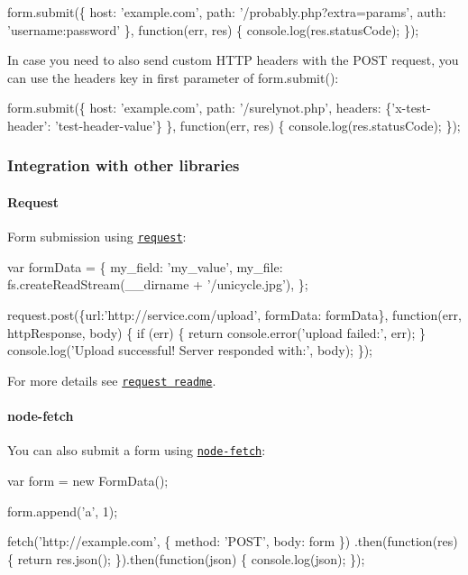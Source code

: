 \begin{DoxyCode}
form.submit(\{
  host: 'example.com',
  path: '/probably.php?extra=params',
  auth: 'username:password'
\}, function(err, res) \{
  console.log(res.statusCode);
\});
\end{DoxyCode}


In case you need to also send custom H\+T\+TP headers with the P\+O\+ST request, you can use the {\ttfamily headers} key in first parameter of {\ttfamily form.\+submit()}\+:


\begin{DoxyCode}
form.submit(\{
  host: 'example.com',
  path: '/surelynot.php',
  headers: \{'x-test-header': 'test-header-value'\}
\}, function(err, res) \{
  console.log(res.statusCode);
\});
\end{DoxyCode}


\subsubsection*{Integration with other libraries}

\paragraph*{Request}

Form submission using \href{https://github.com/request/request}{\tt request}\+:


\begin{DoxyCode}
var formData = \{
  my\_field: 'my\_value',
  my\_file: fs.createReadStream(\_\_dirname + '/unicycle.jpg'),
\};

request.post(\{url:'http://service.com/upload', formData: formData\}, function(err, httpResponse, body) \{
  if (err) \{
    return console.error('upload failed:', err);
  \}
  console.log('Upload successful!  Server responded with:', body);
\});
\end{DoxyCode}


For more details see \href{https://github.com/request/request#multipartform-data-multipart-form-uploads}{\tt request readme}.

\paragraph*{node-\/fetch}

You can also submit a form using \href{https://github.com/bitinn/node-fetch}{\tt node-\/fetch}\+:


\begin{DoxyCode}
var form = new FormData();

form.append('a', 1);

fetch('http://example.com', \{ method: 'POST', body: form \})
    .then(function(res) \{
        return res.json();
    \}).then(function(json) \{
        console.log(json);
    \});
\end{DoxyCode}


